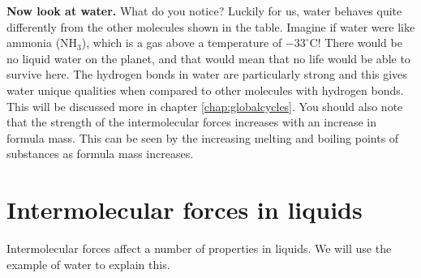 \textbf{Now look at water.} What do you notice? Luckily for us, water behaves quite differently from the other molecules shown in the table. Imagine if water were like ammonia (NH$_{3}$), which is a gas above a temperature of $-33^{\circ} \text{C}$! There would be no liquid water on the planet, and that would mean that no life would be able to survive here. The hydrogen bonds in water are particularly strong and this gives water unique qualities when compared to other molecules with hydrogen bonds. This will be discussed more in chapter \ref{chap:globalcycles}. You should also note that the strength of the intermolecular forces increases with an increase in formula mass. This can be seen by the increasing melting and boiling points of substances as formula mass increases.


\section{Intermolecular forces in liquids}
\label{sec:intermolecular:liquids}

Intermolecular forces affect a number of properties in liquids. We will use the example of water to explain this.


